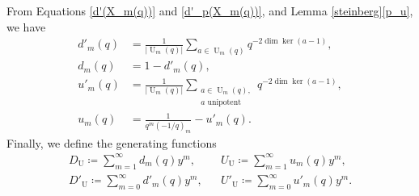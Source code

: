 \documentclass[a4paper, 12pt, oneside]{amsart}
\theoremstyle{definition}
\DeclareMathOperator{\U}{U}
\begin{document}
From Equations \eqref{d'(X_m(q))} and \eqref{d'_p(X_m(q))}, and Lemma \ref{steinberg}\eqref{p_u}, we have
\begin{align*}
d'_m(q)&=\frac{1}{|\U_m(q)|}\sum_{a \in \U_m(q)}q^{-2\dim \ker(a-1)}, \\
d_m(q)&=1-d'_m(q), \\
 u'_m(q)&=\frac{1}{|\U_m(q)|}\sum_{\substack{a \in \U_m(q), \\a \text{ unipotent}}}q^{-2\dim \ker(a-1)}, \\
 u_m(q)&=\frac{1}{q^m(-1/q)_m}-u'_m(q).
 \end{align*}
Finally, we define the generating functions
\begin{align}
D_{\U} \coloneqq \sum_{m=1}^{\infty}d_m(q)y^m, &&
U_{\U} \coloneqq \sum_{m=1}^{\infty}u_m(q)y^m, \\
\label{D'_U}
D'_{\U}\coloneqq\sum_{m=0}^{\infty}d'_m(q)y^m, && U'_{\U} \coloneqq\sum_{m=0}^{\infty}u'_m(q)y^m.
\end{align}
\end{document}
